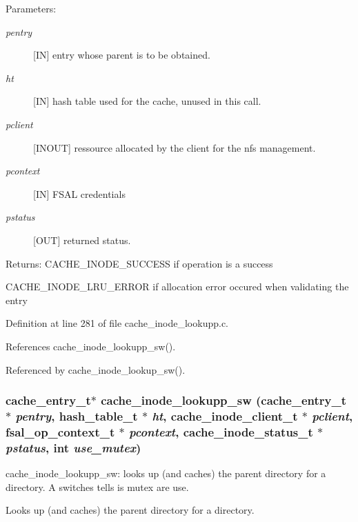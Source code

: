 \begin{Desc}
\item[Parameters:]
\begin{description}
\item[{\em pentry}][IN] entry whose parent is to be obtained. \item[{\em ht}][IN] hash table used for the cache, unused in this call. \item[{\em pclient}][INOUT] ressource allocated by the client for the nfs management. \item[{\em pcontext}][IN] FSAL credentials \item[{\em pstatus}][OUT] returned status.\end{description}
\end{Desc}
\begin{Desc}
\item[Returns:]CACHE\_\-INODE\_\-SUCCESS if operation is a success \par
 

CACHE\_\-INODE\_\-LRU\_\-ERROR if allocation error occured when validating the entry \end{Desc}


Definition at line 281 of file cache\_\-inode\_\-lookupp.c.

References cache\_\-inode\_\-lookupp\_\-sw().

Referenced by cache\_\-inode\_\-lookup\_\-sw().
\subsubsection{\setlength{\rightskip}{0pt plus 5cm}cache\_\-entry\_\-t$\ast$ cache\_\-inode\_\-lookupp\_\-sw (cache\_\-entry\_\-t $\ast$ {\em pentry}, hash\_\-table\_\-t $\ast$ {\em ht}, cache\_\-inode\_\-client\_\-t $\ast$ {\em pclient}, fsal\_\-op\_\-context\_\-t $\ast$ {\em pcontext}, cache\_\-inode\_\-status\_\-t $\ast$ {\em pstatus}, int {\em use\_\-mutex})}\label{cache__inode__lookupp_8c_a0}


cache\_\-inode\_\-lookupp\_\-sw: looks up (and caches) the parent directory for a directory. A switches tells is mutex are use.

Looks up (and caches) the parent directory for a directory.

